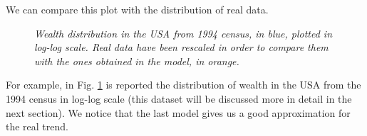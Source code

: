 We can compare this plot with the distribution of real data.
\begin{figure}[H]
    \centering
    \scalebox{.7}{}
    \caption{\emph{Wealth distribution in the USA from 1994 census, in blue, plotted in log-log scale.
					Real data have been rescaled in order to compare them with the ones obtained in the model, in orange.}}
    \label{fig:savingsLog}
\end{figure}
For example, in Fig. \ref{fig:savingsLog} is reported the distribution of wealth in the USA from the 1994 census in log-log scale (this dataset will be discussed more in detail in the next section).
We notice that the last model gives us a good approximation for the real trend.
